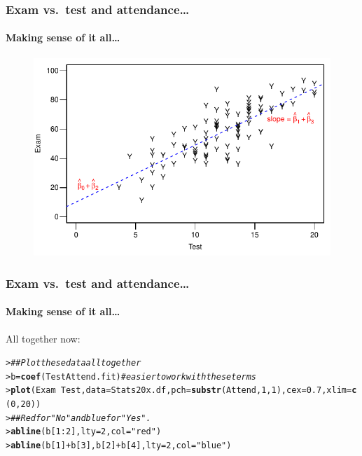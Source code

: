 \documentclass{beamer}\usepackage[]{graphicx}\usepackage[]{xcolor}
\makeatletter
\newcommand{\hlnum}[1]{\textcolor[rgb]{0.686,0.059,0.569}{#1}}%
\newcommand{\hlstr}[1]{\textcolor[rgb]{0.192,0.494,0.8}{#1}}%
\newcommand{\hlcom}[1]{\textcolor[rgb]{0.678,0.584,0.686}{\textit{#1}}}%
\newcommand{\hlopt}[1]{\textcolor[rgb]{0,0,0}{#1}}%
\newcommand{\hlstd}[1]{\textcolor[rgb]{0.345,0.345,0.345}{#1}}%
\newcommand{\hlkwb}[1]{\textcolor[rgb]{0.69,0.353,0.396}{#1}}%
\newcommand{\hlkwc}[1]{\textcolor[rgb]{0.333,0.667,0.333}{#1}}%
\newcommand{\hlkwd}[1]{\textcolor[rgb]{0.737,0.353,0.396}{\textbf{#1}}}%
\newenvironment{kframe}{%
 \def\at@end@of@kframe{}%
 \ifinner\ifhmode%
  \def\at@end@of@kframe{\end{minipage}}%
  \begin{minipage}{\columnwidth}%
 \fi\fi%
 \def\FrameCommand##1{\hskip\@totalleftmargin \hskip-\fboxsep
 \colorbox{shadecolor}{##1}\hskip-\fboxsep
     \hskip-\linewidth \hskip-\@totalleftmargin \hskip\columnwidth}%
 \MakeFramed {\advance\hsize-\width
   \@totalleftmargin\z@ \linewidth\hsize
   \@setminipage}}%
 {\par\unskip\endMakeFramed%
 \at@end@of@kframe}
\newenvironment{knitrout}{}{} %
\makeatother
\begin{document}
\begin{frame}[fragile]
\frametitle{Exam vs.\ test \textbf{and} attendance\ldots}
\framesubtitle{Making sense of it all\ldots}


\begin{figure}
  \centering
  \includegraphics{figure/RC-H08-024}
\end{figure}

\end{frame}


\begin{frame}[fragile]
\frametitle{Exam vs.\ test \textbf{and} attendance\ldots}
\framesubtitle{Making sense of it all\ldots}

All together now:
\begin{knitrout}\scriptsize
{}\color{fgcolor}\begin{kframe}
\begin{alltt}
\hlstd{> }\hlcom{## Plot these data all together}
\hlstd{> }\hlstd{b}\hlkwb{=}\hlkwd{coef}\hlstd{(TestAttend.fit)} \hlcom{# easier to work with these terms}
\hlstd{> }\hlkwd{plot}\hlstd{(Exam} \hlopt{~} \hlstd{Test,}\hlkwc{data} \hlstd{= Stats20x.df,}\hlkwc{pch}\hlstd{=}\hlkwd{substr}\hlstd{(Attend,}\hlnum{1}\hlstd{,}\hlnum{1}\hlstd{),}\hlkwc{cex}\hlstd{=}\hlnum{0.7}\hlstd{,}\hlkwc{xlim}\hlstd{=}\hlkwd{c}\hlstd{(}\hlnum{0}\hlstd{,}\hlnum{20}\hlstd{))}
\hlstd{> }\hlcom{## Red for "No" and blue for "Yes".}
\hlstd{> }\hlkwd{abline}\hlstd{(b[}\hlnum{1}\hlopt{:}\hlnum{2}\hlstd{],} \hlkwc{lty} \hlstd{=}\hlnum{2}\hlstd{,} \hlkwc{col}\hlstd{=}\hlstr{"red"}\hlstd{)}
\hlstd{> }\hlkwd{abline}\hlstd{(b[}\hlnum{1}\hlstd{]}\hlopt{+}\hlstd{b[}\hlnum{3}\hlstd{],b[}\hlnum{2}\hlstd{]}\hlopt{+}\hlstd{b[}\hlnum{4}\hlstd{],}\hlkwc{lty}\hlstd{=}\hlnum{2}\hlstd{,} \hlkwc{col}\hlstd{=}\hlstr{"blue"} \hlstd{)}
\end{alltt}
\end{kframe}
\end{knitrout}

\end{frame}
\end{document}
